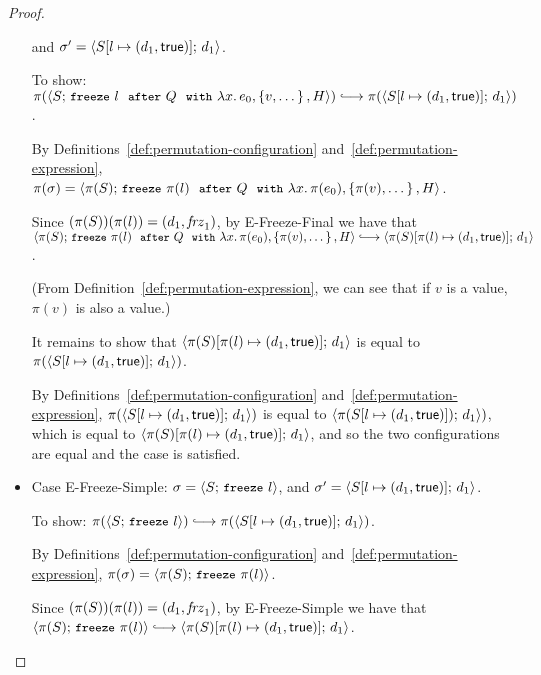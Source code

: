 \begin{proof}
\begin{itemize}
    and $\sigma' = \langle S[l \mapsto (d_1, \textsf{true})];\, d_1 \rangle$.

    To show:
    $\pi(\config{S}{\freezeafterfull{l}{Q}{\lam{x}{e_0}}{\setof{v,
          \dots}}{H}}) \parstepsto \\
    \pi(\config{\extS{S}{l}{d_1}{\frozentrue}}{d_1})$.

    By Definitions~\ref{def:permutation-configuration}
    and~\ref{def:permutation-expression}, $\pi(\sigma) = \\
    \langle \pi(S);\, \mbox{\small{\texttt{freeze}}}~\pi(l)~~{\mbox{\small{\texttt{after}}}}~Q~~{\mbox{\small{\texttt{with}}}}~\lambda x.\,\pi(e_0), \left\{\pi(v),
          \dots\right\}, H \rangle$.

    Since $(\pi(S))(\pi(l)) = (d_1, \mathit{frz}_1)$, by {\sc
      E-Freeze-Final} we have that \\
    $\config{\pi(S)}{\freezeafterfull{\pi(l)}{Q}{\lam{x}{\pi(e_0)}}{\setof{\pi(v),
          \dots}}{H}} \parstepsto \\
    \config{\extS{\pi(S)}{\pi(l)}{d_1}{\frozentrue}}{d_1}$.

    (From Definition~\ref{def:permutation-expression}, we can see that
    if $v$ is a value, $\pi(v)$ is also a value.)

    It remains to show that
    $\langle \pi(S)[\pi(l) \mapsto (d_1, \textsf{true})];\, d_1 \rangle$ is equal
    to $\pi(\langle S[l \mapsto (d_1, \textsf{true})];\, d_1 \rangle)$.

    By Definitions~\ref{def:permutation-configuration}
    and~\ref{def:permutation-expression},
    $\pi(\langle S[l \mapsto (d_1, \textsf{true})];\, d_1 \rangle)$ is equal to
    $\langle \pi(S[l \mapsto (d_1, \textsf{true})]);\, d_1 \rangle)$, which is
    equal to
    $\langle \pi(S)[\pi(l) \mapsto (d_1, \textsf{true})];\, d_1 \rangle$, and so
    the two configurations are equal and the case is satisfied.

  \item Case {\sc E-Freeze-Simple}: $\sigma =
    \langle S;\, \mbox{\small{\texttt{freeze}}}~l \rangle$, and $\sigma' =
    \langle S[l \mapsto (d_1, \textsf{true})];\, d_1 \rangle$.

    To show: $\pi(\config{S}{\freeze{l}}) \parstepsto
    \pi(\config{\extS{S}{l}{d_1}{\frozentrue}}{d_1})$.

    By Definitions~\ref{def:permutation-configuration}
    and~\ref{def:permutation-expression}, $\pi(\sigma) =
    \langle \pi(S);\, \mbox{\small{\texttt{freeze}}}~\pi(l) \rangle$.

    Since $(\pi(S))(\pi(l)) = (d_1, \mathit{frz}_1)$, by {\sc
      E-Freeze-Simple} we have that
    $\config{\pi(S)}{\freeze{\pi(l)}} \parstepsto
    \config{\extS{\pi(S)}{\pi(l)}{d_1}{\frozentrue}}{d_1}$.


\end{itemize}
\end{proof}
